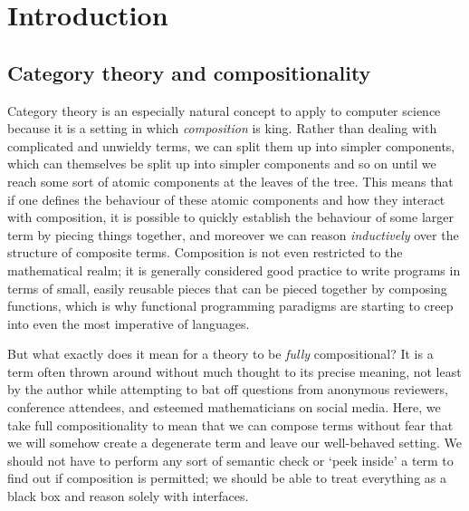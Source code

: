 \chapter{Introduction}




\section{Category theory and compositionality}

Category theory is an especially natural concept to apply to computer science
because it is a setting in which \emph{composition} is king.
Rather than dealing with complicated and unwieldy terms, we can split them
up into simpler components, which can themselves be split up into simpler
components and so on until we reach some sort of atomic components at the leaves
of the tree.
This means that if one defines the behaviour of these atomic components and
how they interact with composition, it is possible to quickly establish the
behaviour of some larger term by piecing things together, and moreover we can
reason \emph{inductively} over the structure of composite terms.
Composition is not even restricted to the mathematical realm; it is generally
considered good practice to write programs in terms of small, easily reusable
pieces that can be pieced together by composing functions, which is why
functional programming paradigms are starting to creep into even the most
imperative of languages.

But what exactly does it mean for a theory to be \emph{fully} compositional?
It is a term often thrown around without much thought to its precise meaning,
not least by the author while attempting to bat off questions from anonymous
reviewers, conference attendees, and esteemed mathematicians on social media.
Here, we take full compositionality to mean that we can compose terms without
fear that we will somehow create a degenerate term and leave our well-behaved
setting.
We should not have to perform any sort of semantic check or `peek inside' a term
to find out if composition is permitted; we should be able to treat everything
as a black box and reason solely with interfaces.


